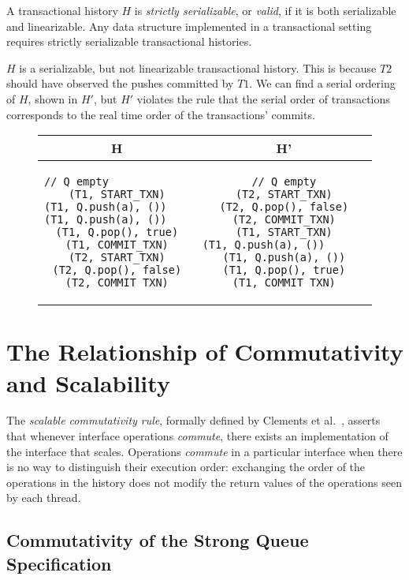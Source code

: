 \begin{defn}
    A transactional history $H$ is \emph{strictly serializable}, or \emph{valid}, if it is both serializable and linearizable. Any data structure implemented in a transactional setting requires strictly serializable transactional histories.
\end{defn}

\begin{eg}
$H$ is a serializable, but not linearizable transactional history. This is because $T2$ should have observed the pushes committed by $T1$. We can find a serial ordering of $H$, shown in $H'$, but $H'$ violates the rule that the serial order of transactions corresponds to the real time order of the transactions' commits.
    
\begin{figure}[H]
    \centering
\singlespacing   
    \begin{tabular}{c|c}
H & H'\\
\hline
\begin{lstlisting}
// Q empty                          
(T1, START_TXN)
(T1, Q.push(a), ())                
(T1, Q.push(a), ())               
(T1, Q.pop(), true)
(T1, COMMIT_TXN)
(T2, START_TXN)
(T2, Q.pop(), false)
(T2, COMMIT_TXN)
\end{lstlisting} & 
\begin{lstlisting}
// Q empty
(T2, START_TXN)
(T2, Q.pop(), false)
(T2, COMMIT_TXN)
(T1, START_TXN)
(T1, Q.push(a), ())                       
(T1, Q.push(a), ())
(T1, Q.pop(), true)
(T1, COMMIT_TXN)
\end{lstlisting}
    \end{tabular}
\end{figure}
\end{eg}

\section{The Relationship of Commutativity and Scalability}

The \emph{scalable commutativity rule}, formally defined by Clements et al.~\cite{scrule}, asserts that whenever interface operations \emph{commute}, there exists an implementation of the interface that scales.
Operations \emph{commute} in a particular interface when there is no way to distinguish their execution order: exchanging the order of the operations in the history does not modify the return values of the operations seen by each thread.

\subsection{Commutativity of the Strong Queue Specification} 

